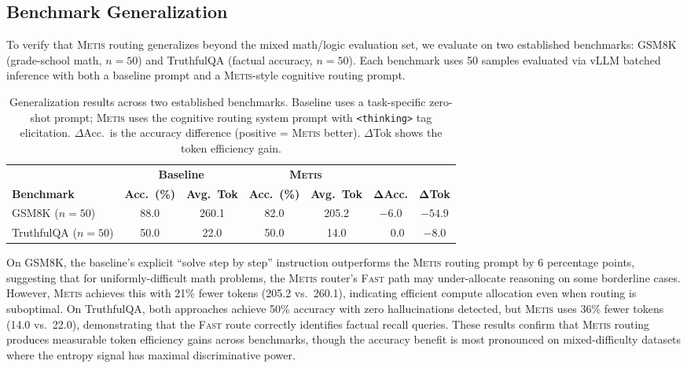 \documentclass[11pt,a4paper]{article}
\newcommand{\metis}{\textsc{Metis}}
\begin{document}
\subsection{Benchmark Generalization}
\label{sec:generalization}

To verify that \metis{} routing generalizes beyond the mixed math/logic evaluation set, we evaluate on two established benchmarks: GSM8K (grade-school math, $n{=}50$) and TruthfulQA (factual accuracy, $n{=}50$). Each benchmark uses 50 samples evaluated via vLLM batched inference with both a baseline prompt and a \metis{}-style cognitive routing prompt.

\begin{table}[ht]
\centering
\caption{Generalization results across two established benchmarks. Baseline uses a task-specific zero-shot prompt; \metis{} uses the cognitive routing system prompt with \texttt{<thinking>} tag elicitation. $\Delta$Acc.\ is the accuracy difference (positive = \metis{} better). $\Delta$Tok shows the token efficiency gain.}
\label{tab:generalization}
\begin{tabular}{@{}lcccccc@{}}
\toprule
& \multicolumn{2}{c}{\textbf{Baseline}} & \multicolumn{2}{c}{\textbf{\metis{}}} & & \\
\cmidrule{2-3} \cmidrule{4-5}
\textbf{Benchmark} & \textbf{Acc.\ (\%)} & \textbf{Avg.\ Tok} & \textbf{Acc.\ (\%)} & \textbf{Avg.\ Tok} & $\boldsymbol{\Delta}$\textbf{Acc.} & $\boldsymbol{\Delta}$\textbf{Tok} \\
\midrule
GSM8K ($n{=}50$)       & 88.0 & 260.1 & 82.0 & 205.2 & $-6.0$ & $-54.9$ \\
TruthfulQA ($n{=}50$)  & 50.0 &  22.0 & 50.0 &  14.0 & $\phantom{-}0.0$ & $-8.0$ \\
\bottomrule
\end{tabular}
\end{table}

On GSM8K, the baseline's explicit ``solve step by step'' instruction outperforms the \metis{} routing prompt by 6 percentage points, suggesting that for uniformly-difficult math problems, the \metis{} router's \textsc{Fast} path may under-allocate reasoning on some borderline cases. However, \metis{} achieves this with 21\% fewer tokens (205.2 vs.\ 260.1), indicating efficient compute allocation even when routing is suboptimal. On TruthfulQA, both approaches achieve 50\% accuracy with zero hallucinations detected, but \metis{} uses 36\% fewer tokens (14.0 vs.\ 22.0), demonstrating that the \textsc{Fast} route correctly identifies factual recall queries. These results confirm that \metis{} routing produces measurable token efficiency gains across benchmarks, though the accuracy benefit is most pronounced on mixed-difficulty datasets where the entropy signal has maximal discriminative power.
\end{document}
